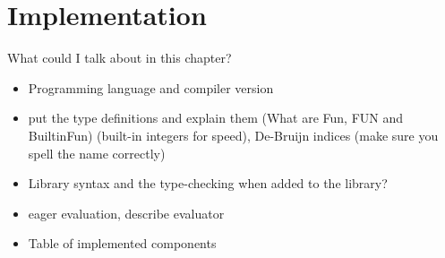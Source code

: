 \chapter{Implementation} \label{implementation}

What could I talk about in this chapter?
\begin{itemize}
\item Programming language and compiler version
\item put the type definitions and explain them (What are Fun, FUN and BuiltinFun) (built-in integers for speed), De-Bruijn indices (make sure you spell the name correctly)
\item Library syntax and the type-checking when added to the library?
\item eager evaluation, describe evaluator
\item Table of implemented components
\end{itemize}



